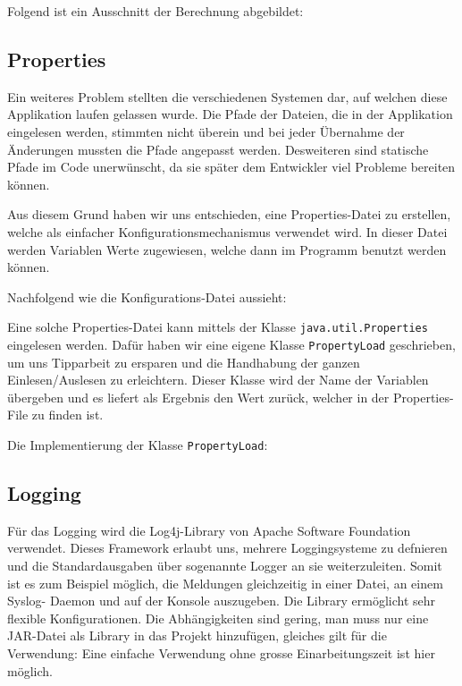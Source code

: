 Folgend ist ein Ausschnitt der Berechnung abgebildet:



\subsection{Properties}
Ein weiteres Problem stellten die verschiedenen Systemen dar, auf welchen
diese Applikation laufen gelassen wurde. Die Pfade der Dateien, die in der
Applikation eingelesen werden, stimmten nicht überein und bei jeder Übernahme
der Änderungen mussten die Pfade angepasst werden. Desweiteren sind statische
Pfade im Code unerwünscht, da sie später dem Entwickler viel Probleme bereiten
können. 

Aus diesem Grund haben wir uns entschieden, eine Properties-Datei zu
erstellen, welche als einfacher Konfigurationsmechanismus verwendet wird. In
dieser Datei werden Variablen Werte zugewiesen, welche dann im Programm
benutzt werden können.

Nachfolgend wie die Konfigurations-Datei aussieht:



Eine solche Properties-Datei kann mittels der Klasse
\texttt{java.util.Properties} eingelesen werden. Dafür haben wir eine eigene
Klasse \texttt{PropertyLoad} geschrieben, um uns Tipparbeit zu ersparen und
die Handhabung der ganzen Einlesen/Auslesen zu erleichtern. Dieser Klasse wird
der Name der Variablen übergeben und es liefert als Ergebnis den Wert zurück,
welcher in der Properties-File zu finden ist.

Die Implementierung der Klasse \texttt{PropertyLoad}:



\subsection{Logging}
Für das Logging wird die Log4j-Library von Apache Software Foundation
verwendet. Dieses Framework erlaubt uns, mehrere Loggingsysteme zu defnieren
und die Standardausgaben über sogenannte Logger an sie weiterzuleiten. Somit
ist es zum Beispiel möglich, die Meldungen gleichzeitig in einer Datei, an
einem Syslog- Daemon und auf der Konsole auszugeben. Die Library ermöglicht
sehr flexible Konfigurationen. Die Abhängigkeiten sind gering, man muss nur
eine JAR-Datei als Library in das Projekt hinzufügen, gleiches gilt für die
Verwendung: Eine einfache Verwendung ohne grosse Einarbeitungszeit ist hier
möglich.

